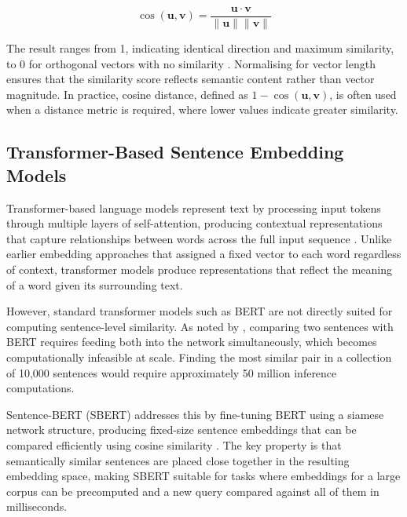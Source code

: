 \begin{equation}
    \cos(\mathbf{u}, \mathbf{v}) = 
    \frac{\mathbf{u} \cdot \mathbf{v}}{\|\mathbf{u}\| \|\mathbf{v}\|}
    \label{eq:cosine-similarity}
\end{equation}

The result ranges from 1, indicating identical direction and 
maximum similarity, to 0 for orthogonal vectors with no similarity 
\parencite[Chapter~5.4]{jurafsky_martin2026speech_language_processing}. 
Normalising for vector length ensures that the similarity score 
reflects semantic content rather than vector magnitude. In 
practice, cosine distance, defined as $1 - \cos(\mathbf{u}, 
\mathbf{v})$, is often used when a distance metric is required, 
where lower values indicate greater similarity.

\subsection{Transformer-Based Sentence Embedding Models}
\label{sec:transformer-based-sentence-embedding-models}

Transformer-based language models represent text by processing 
input tokens through multiple layers of self-attention, producing 
contextual representations that capture relationships between 
words across the full input sequence 
\parencite{vaswani2023attentionneed}. Unlike earlier embedding 
approaches that assigned a fixed vector to each word regardless 
of context, transformer models produce representations that 
reflect the meaning of a word given its surrounding text.

However, standard transformer models such as BERT are not 
directly suited for computing sentence-level similarity. As 
noted by \textcite{reimers2019sentence_bert_sentence_embeddings_using_siamese_bert_networks}, 
comparing two sentences with BERT requires feeding both into 
the network simultaneously, which becomes computationally 
infeasible at scale. Finding the most similar pair in a 
collection of 10,000 sentences would require approximately 50 
million inference computations.

Sentence-BERT (SBERT) addresses this by fine-tuning BERT 
using a siamese network structure, producing fixed-size sentence 
embeddings that can be compared efficiently using cosine 
similarity \parencite{reimers2019sentence_bert_sentence_embeddings_using_siamese_bert_networks}. 
The key property is that semantically similar sentences are 
placed close together in the resulting embedding space, making 
SBERT suitable for tasks where embeddings for a large corpus 
can be precomputed and a new query compared against all of 
them in milliseconds.

